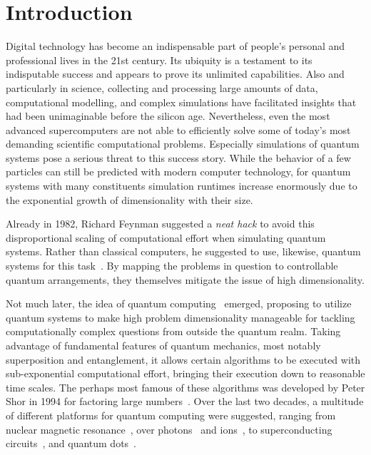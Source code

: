 \renewcommand{\imagepath}{../10-intro/img}

\chapter{Introduction}
Digital technology has become an indispensable part of people's personal and professional lives in the 21st century. Its ubiquity is a testament to its indisputable success and appears to prove its unlimited capabilities. Also and particularly in science, collecting and processing large amounts of data, computational modelling, and complex simulations have facilitated insights that had been unimaginable before the silicon age. Nevertheless, even the most advanced supercomputers are not able to efficiently solve some of today's most demanding scientific computational problems. Especially simulations of quantum systems pose a serious threat to this success story. While the behavior of a few particles can still be predicted with modern computer technology, for quantum systems with many constituents simulation runtimes increase enormously due to the exponential growth of dimensionality with their size.

Already in 1982, Richard Feynman suggested a \textit{neat hack} to avoid this disproportional scaling of computational effort when simulating quantum systems. Rather than classical computers, he suggested to use, likewise, quantum systems for this task~\cite{feynman_simulating_1982}. By mapping the problems in question to controllable quantum arrangements, they themselves mitigate the issue of high dimensionality.

Not much later, the idea of quantum computing~\cite{nielsen_quantum_2010, hidary_quantum_2021, ladd_quantum_2010, mainzer_quantencomputer_2020} emerged, proposing to utilize quantum systems to make high problem dimensionality manageable for tackling computationally complex questions from outside the quantum realm. Taking advantage of fundamental features of quantum mechanics, most notably superposition and entanglement, it allows certain algorithms to be executed with sub-exponential computational effort, bringing their execution down to reasonable time scales. The perhaps most famous of these algorithms was developed by Peter Shor in 1994 for factoring large numbers~\cite{shor_algorithms_1994}. Over the last two decades, a multitude of different platforms for quantum computing were suggested, ranging from nuclear magnetic resonance~\cite{cory_ensemble_1997}, over photons~\cite{duan_scalable_2004,zhong_quantum_2020} and ions~\cite{home_complete_2009}, to superconducting circuits~\cite{dicarlo_demonstration_2009, arute_quantum_2019-1}, and quantum dots~\cite{hanson_spins_2007}.

